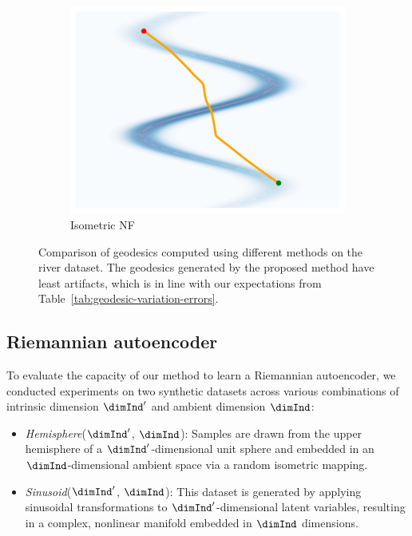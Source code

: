 \begin{figure}[htbp]
\begin{subfigure}[b]{0.18\textwidth}
            \includegraphics[width=\textwidth]{chapter5/results/visualisations/geodesics/isometricNF.png}
            \caption{Isometric NF}
        \end{subfigure}
        \caption{Comparison of geodesics computed using different methods on the river dataset. The geodesics generated by the proposed method have least artifacts, which is in line with our expectations from Table~\ref{tab:geodesic-variation-errors}.}
        \label{fig:geodesics_comparison}
    \end{figure}

\subsection{Riemannian autoencoder}
    \label{sec:RAE-experiments}
    To evaluate the capacity of our method to learn a Riemannian autoencoder, we conducted experiments on two synthetic datasets across various combinations of intrinsic dimension $\dimInd'$ and ambient dimension $\dimInd$:
    
    \begin{itemize}
        \item \textit{Hemisphere}($\dimInd'$, $\dimInd$): Samples are drawn from the upper hemisphere of a $\dimInd'$-dimensional unit sphere and embedded in an $\dimInd$-dimensional ambient space via a random isometric mapping.
        \item \textit{Sinusoid}($\dimInd'$, $\dimInd$): This dataset is generated by applying sinusoidal transformations to $\dimInd'$-dimensional latent variables, resulting in a complex, nonlinear manifold embedded in $\dimInd$ dimensions.
    \end{itemize}
    
